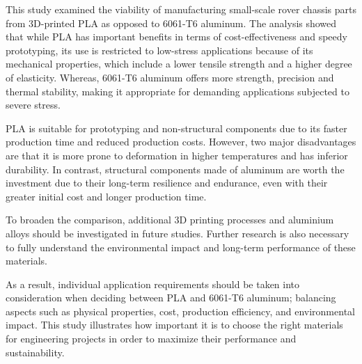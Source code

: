 This study examined the viability of manufacturing small-scale rover chassis parts from 3D-printed PLA as
opposed to 6061-T6 aluminum. The analysis showed that while PLA has important benefits in terms of
cost-effectiveness and speedy prototyping, its use is restricted to low-stress applications because of its
mechanical properties, which include a lower tensile strength and a higher degree of elasticity. Whereas,
6061-T6 aluminum offers more strength, precision and thermal stability, making it appropriate for
demanding applications subjected to severe stress.

PLA is suitable for prototyping and non-structural components due to its faster production time and
reduced production costs. However, two major disadvantages are that it is more prone to deformation in
higher temperatures and has inferior durability. In contrast, structural components made of aluminum are
worth the investment due to their long-term resilience and endurance, even with their greater initial cost
and longer production time.

To broaden the comparison, additional 3D printing processes and aluminium alloys should be investigated
in future studies. Further research is also necessary to fully understand the environmental impact and
long-term performance of these materials.

As a result, individual application requirements should be taken into consideration when deciding between
PLA and 6061-T6 aluminum; balancing aspects such as physical properties, cost, production efficiency,
and environmental impact. This study illustrates how important it is to choose the right materials for
engineering projects in order to maximize their performance and sustainability.